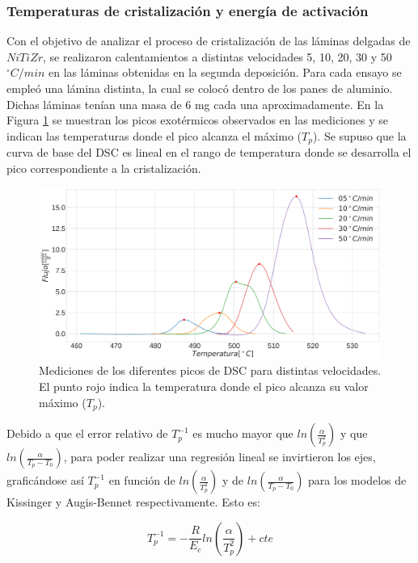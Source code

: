 \documentclass[12pt]{article}
\theoremstyle{definition}
\theoremstyle{remark}
\begin{document}
{\subsubsection{Temperaturas de cristalización y energía de activación}

Con el objetivo de analizar el proceso de cristalización de las láminas delgadas de $NiTiZr$, se realizaron calentamientos a distintas velocidades 5, 10, 20, 30 y 50 $^{\circ} C/min$ en las láminas obtenidas en la segunda deposición. Para cada ensayo se empleó una lámina distinta, la cual se colocó dentro de los panes de aluminio. Dichas láminas tenían una masa de 6 mg cada una aproximadamente. En la Figura \ref{DSCPeaks} se muestran los picos exotérmicos observados en las mediciones y se indican las temperaturas donde el pico alcanza el máximo ($T_p$). Se supuso que la curva de base del DSC es lineal en el rango de temperatura donde se desarrolla el pico correspondiente a la cristalización.

\begin{figure}[H]
	\centering
	\includegraphics[scale=0.2]{img/DSCPeaks}
	\caption{Mediciones de los diferentes picos de DSC para distintas velocidades. El punto rojo indica la temperatura donde el pico alcanza su valor máximo ($T_p$).}
	\label{DSCPeaks}
\end{figure}

Debido a que el error relativo de $T_p^{-1}$ es mucho mayor que $ln(\frac{\alpha}{T_p^2})$ y que $ln(\frac{\alpha}{T_p-T_0})$, para poder realizar una regresión lineal se invirtieron los ejes, graficándose así $T_p^{-1}$ en función de $ln(\frac{\alpha}{T_p^2})$ y de $ln(\frac{\alpha}{T_p-T_0})$ para los modelos de Kissinger y Augis-Bennet respectivamente. Esto es:

\begin{equation}
\label{EquationKissinger}
	T_p^{-1}=-\frac{R}{E_c}ln(\frac{\alpha}{T_p^2})+cte
\end{equation}

}
\end{document}
